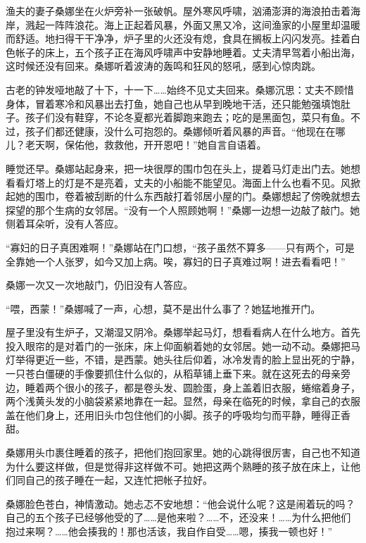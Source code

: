 \documentclass[12pt,UTF-8,openany]{ctexbook}
\begin{document}
\begin{large}
    
    渔夫的妻子桑娜坐在火炉旁补一张破帆。屋外寒风呼啸，汹涌澎湃的海浪拍击着海岸，溅起一阵阵浪花。海上正起着风暴，外面又黑又冷，这间渔家的小屋里却温暖而舒适。地扫得干干净净，炉子里的火还没有熄，食具在搁板上闪闪发亮。挂着白色帐子的床上，五个孩子正在海风呼啸声中安静地睡着。丈夫清早驾着小船出海，这时候还没有回来。桑娜听着波涛的轰鸣和狂风的怒吼，感到心惊肉跳。
    
    古老的钟发哑地敲了十下，十一下……始终不见丈夫回来。桑娜沉思：丈夫不顾惜身体，冒着寒冷和风暴出去打鱼，她自己也从早到晚地干活，还只能勉强填饱肚子。孩子们没有鞋穿，不论冬夏都光着脚跑来跑去；吃的是黑面包，菜只有鱼。不过，孩子们都还健康，没什么可抱怨的。桑娜倾听着风暴的声音。“他现在在哪儿？老天啊，保佑他，救救他，开开恩吧！”她自言自语着。
    
    睡觉还早。桑娜站起身来，把一块很厚的围巾包在头上，提着马灯走出门去。她想看看灯塔上的灯是不是亮着，丈夫的小船能不能望见。海面上什么也看不见。风掀起她的围巾，卷着被刮断的什么东西敲打着邻居小屋的门。桑娜想起了傍晚就想去探望的那个生病的女邻居。“没有一个人照顾她啊！”桑娜一边想一边敲了敲门。她侧着耳朵听，没有人答应。
    
    “寡妇的日子真困难啊！”桑娜站在门口想，“孩子虽然不算多——只有两个，可是全靠她一个人张罗，如今又加上病。唉，寡妇的日子真难过啊！进去看看吧！”
    
    桑娜一次又一次地敲门，仍旧没有人答应。
    
    “喂，西蒙！”桑娜喊了一声，心想，莫不是出什么事了？她猛地推开门。
    
    屋子里没有生炉子，又潮湿又阴冷。桑娜举起马灯，想看看病人在什么地方。首先投入眼帘的是对着门的一张床，床上仰面躺着她的女邻居。她一动不动。桑娜把马灯举得更近一些，不错，是西蒙。她头往后仰着，冰冷发青的脸上显出死的宁静，一只苍白僵硬的手像要抓住什么似的，从稻草铺上垂下来。就在这死去的母亲旁边，睡着两个很小的孩子，都是卷头发、圆脸蛋，身上盖着旧衣服，蜷缩着身子，两个浅黄头发的小脑袋紧紧地靠在一起。显然，母亲在临死的时候，拿自己的衣服盖在他们身上，还用旧头巾包住他们的小脚。孩子的呼吸均匀而平静，睡得正香甜。
    
    桑娜用头巾裹住睡着的孩子，把他们抱回家里。她的心跳得很厉害，自己也不知道为什么要这样做，但是觉得非这样做不可。她把这两个熟睡的孩子放在床上，让他们同自己的孩子睡在一起，又连忙把帐子拉好。
    
    桑娜脸色苍白，神情激动。她忐忑不安地想：“他会说什么呢？这是闹着玩的吗？自己的五个孩子已经够他受的了……是他来啦？……不，还没来！……为什么把他们抱过来啊？……他会揍我的！那也活该，我自作自受……嗯，揍我一顿也好！”
    

\end{large}
\end{document}
